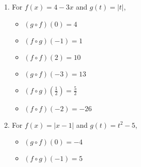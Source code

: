 \documentclass{ximera}
\begin{document}
\begin{enumerate}
\begin{multicols}{3}
\begin{itemize}
\item  $(g\circ f)(-3) = -48$

\item  $(f\circ g)\left(\frac{1}{2}\right) = \frac{13}{4}$

\item  $(f \circ f)(-2) = -2$

\end{itemize}

\end{multicols}

\item  For   $f(x) = 4-3x$ and  $g(t) = |t|$,
\begin{multicols}{3}

\begin{itemize}

\item  $(g\circ f)(0) = 4$

\item  $(f\circ g)(-1) = 1$

\item  $(f \circ f)(2) = 10$

\end{itemize}

\end{multicols}

\begin{multicols}{3}

\begin{itemize}

\item  $(g\circ f)(-3) = 13$

\item  $(f\circ g)\left(\frac{1}{2}\right) = \frac{5}{2}$

\item  $(f \circ f)(-2) = -26$

\end{itemize}

\end{multicols}

\item  For   $f(x) = |x-1|$ and $g(t) = t^2-5$,
\begin{multicols}{3}

\begin{itemize}

\item  $(g\circ f)(0) = -4$

\item  $(f\circ g)(-1) = 5$


\end{itemize}
\end{multicols}
\end{enumerate}
\end{document}
